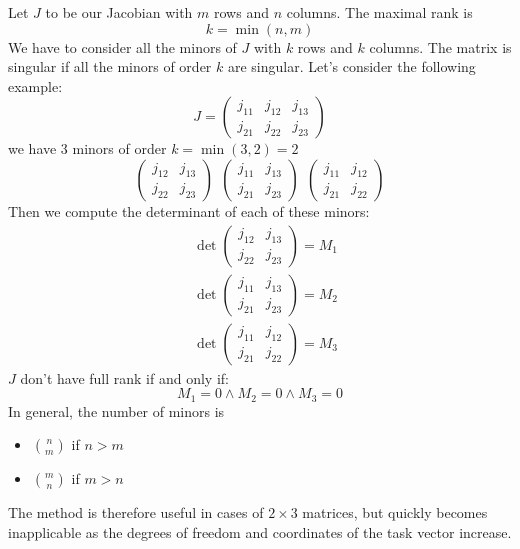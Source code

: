 \documentclass[10pt, letterpaper]{report}
\begin{document}
Let $J$ to be our Jacobian with $m$ rows and $n$ columns. The maximal rank is \begin{equation}
    k=\min(n,m)
\end{equation}
We have to consider all the minors of $J$ with $k$ rows and $k$ columns. The matrix is singular if all the minors of order $k$ are singular. Let's consider the following example:\begin{equation}
    J=\begin{pmatrix}
        j_{11}&j_{12}&j_{13}\\
         j_{21}&j_{22}&j_{23}
    \end{pmatrix}
\end{equation}
we have 3 minors of order $k=\min(3,2)=2$\begin{equation}
    \begin{pmatrix}
        j_{12}&j_{13}\\
       j_{22}&j_{23}
    \end{pmatrix} \ \  
    \begin{pmatrix}
        j_{11}&j_{13}\\
         j_{21}&j_{23}
    \end{pmatrix} \ \  
    \begin{pmatrix}
        j_{11}&j_{12}\\
         j_{21}&j_{22}
    \end{pmatrix}
\end{equation}
Then we compute the determinant of each of these minors:\begin{align}
    &\det\begin{pmatrix}
        j_{12}&j_{13}\\
       j_{22}&j_{23}
    \end{pmatrix}=M_1 \\ 
    &\det \begin{pmatrix}
        j_{11}&j_{13}\\
         j_{21}&j_{23}
    \end{pmatrix}=M_2\\ 
    &\det \begin{pmatrix}
        j_{11}&j_{12}\\
         j_{21}&j_{22}
    \end{pmatrix}=M_3
\end{align}
$J$ don't have full rank if and only if:\begin{equation}
    M_1=0 \land M_2=0 \land M_3=0
\end{equation}
In general, the number of minors is\begin{itemize}
    \item $\binom{n}{m}$ if $n>m$
    \item $\binom{m}{n}$ if $m>n$
\end{itemize}
The method is therefore useful in cases of $2\times 3$ matrices, but quickly becomes inapplicable as the degrees of freedom and coordinates of the task vector increase.
\end{document}
